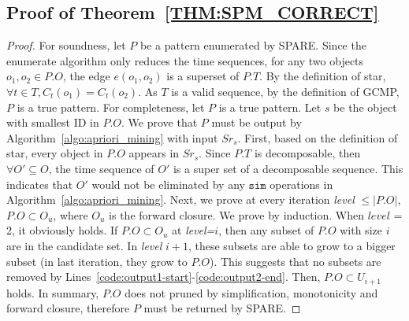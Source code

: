 \subsection{Proof of Theorem~\ref{THM:SPM_CORRECT}}
\label{apx:spm_correct}
\begin{proof}
For soundness, let $P$ be a pattern enumerated by SPARE. Since the enumerate algorithm only reduces the time sequences, for any two objects $o_1, o_2 \in P.O$, the edge $e(o_1,o_2)$ is a superset of $P.T$. By the definition of star, $\forall t \in T, C_t(o_1) = C_t(o_2)$. As $T$ is a valid sequence, by the definition of GCMP, $P$ is a true pattern.
For completeness, let $P$ is a true pattern. Let $s$ be the object with smallest ID in $P.O$. We prove that $P$ must be output by Algorithm~\ref{algo:apriori_mining} with input $Sr_s$. 
First, based on the definition of star, every object in $P.O$ appears in $Sr_s$. Since $P.T$ is decomposable, then $\forall O' \subseteq O$, the time sequence of $O'$ is a super set of a decomposable sequence. This indicates that $O'$ would not be eliminated by any $\mathtt{sim}$ operations in Algorithm~\ref{algo:apriori_mining}.  Next, we prove at every iteration \emph{level} $\leq |P.O|$, $P.O \subset O_u$, where $O_u$ is the forward closure. We prove by induction. When $level$ = 2, it obviously holds. If $P.O \subset O_u$ at \emph{level=$i$}, then any subset of $P.O$ with size $i$ are in the candidate set. In \emph{level} $i+1$, these subsets are able to grow to a bigger subset (in last iteration, they grow to $P.O$). This suggests that no subsets are removed by Lines~\ref{code:output1-start}-\ref{code:output2-end}. Then, $P.O \subset U_{i+1}$ holds. In summary, $P.O$ does not pruned by simplification, monotonicity and forward closure, therefore $P$ must be returned by SPARE.
\end{proof}
